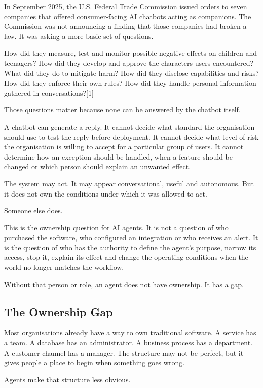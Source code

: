 In September 2025, the U.S. Federal Trade Commission issued orders to
seven companies that offered consumer-facing AI chatbots acting as
companions. The Commission was not announcing a finding that those
companies had broken a law. It was asking a more basic set of questions.

How did they measure, test and monitor possible negative effects on
children and teenagers? How did they develop and approve the characters
users encountered? What did they do to mitigate harm? How did they
disclose capabilities and risks? How did they enforce their own rules?
How did they handle personal information gathered in
conversations?{[}1{]}

Those questions matter because none can be answered by the chatbot
itself.

A chatbot can generate a reply. It cannot decide what standard the
organisation should use to test the reply before deployment. It cannot
decide what level of risk the organisation is willing to accept for a
particular group of users. It cannot determine how an exception should
be handled, when a feature should be changed or which person should
explain an unwanted effect.

The system may act. It may appear conversational, useful and autonomous.
But it does not own the conditions under which it was allowed to act.

Someone else does.

This is the ownership question for AI agents. It is not a question of
who purchased the software, who configured an integration or who
receives an alert. It is the question of who has the authority to define
the agent's purpose, narrow its access, stop it, explain its effect and
change the operating conditions when the world no longer matches the
workflow.

Without that person or role, an agent does not have ownership. It has a
gap.

\subsection{The Ownership Gap}\label{the-ownership-gap}

Most organisations already have a way to own traditional software. A
service has a team. A database has an administrator. A business process
has a department. A customer channel has a manager. The structure may
not be perfect, but it gives people a place to begin when something goes
wrong.

Agents make that structure less obvious.

